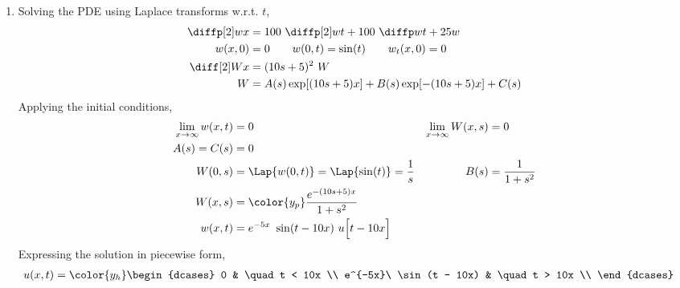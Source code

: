 \begin{enumerate}
    \item Solving the PDE using Laplace transforms w.r.t. $ t $,
          \begin{align}
              \diffp[2] wx & = 100\ \diffp[2] wt + 100\ \diffp wt
              + 25w                                               \\
              w(x, 0)      & = 0 \qquad w(0, t) = \sin(t)
              \qquad w_t(x, 0) = 0                                \\
              \diff[2] Wx  & = (10s + 5)^2\ W                     \\
              W            & = A(s) \exp[(10s + 5)x] + B(s)
              \exp[-(10s + 5)x] + C(s)
          \end{align}
          Applying the initial conditions,
          \begin{align}
              \lim_{x \to \infty} w(x, t) & = 0                        &
              \lim_{x \to \infty} W(x, s) & = 0                          \\
              A(s) = C(s)                 & = 0                          \\
              W(0, s)                     & = \Lap\{w(0, t)\}
              = \Lap\{\sin(t)\}
              = \frac{1}{s}               &
              B(s)                        & = \frac{1}{1 + s^2}          \\
              W(x, s)                     & = \color{y_p}
              \frac{e^{-(10s+5)x}}{1+s^2}                                \\
              w(x, t)                     & = e^{-5x}\ \sin(t - 10x)\
              u \Big[ t - 10x \Big]
          \end{align}
          Expressing the solution in piecewise form,
          \begin{align}
              u(x, t) & = \color{y_h} \begin{dcases}
                                          0                      & \quad t < 10x \\
                                          e^{-5x}\ \sin(t - 10x) & \quad t > 10x \\
                                      \end{dcases}
          \end{align}


\end{enumerate}
